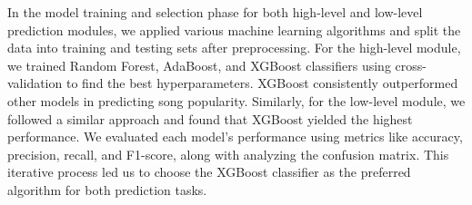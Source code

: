 \documentclass[11pt]{report}
\begin{document}

In the model training and selection phase for both high-level and low-level prediction modules, we applied various machine learning algorithms and split the data into training and testing sets after preprocessing. For the high-level module, we trained Random Forest, AdaBoost, and XGBoost classifiers using cross-validation to find the best hyperparameters. XGBoost consistently outperformed other models in predicting song popularity. Similarly, for the low-level module, we followed a similar approach and found that XGBoost yielded the highest performance. We evaluated each model's performance using metrics like accuracy, precision, recall, and F1-score, along with analyzing the confusion matrix. This iterative process led us to choose the XGBoost classifier as the preferred algorithm for both prediction tasks.
\end{document}
